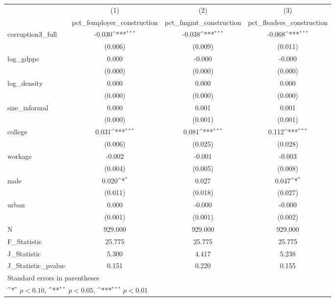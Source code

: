 {
\def\sym#1{\ifmmode^{#1}\else\(^{#1}\)\fi}
\begin{tabular}{l*{3}{c}}
\hline\hline
            &\multicolumn{1}{c}{(1)}&\multicolumn{1}{c}{(2)}&\multicolumn{1}{c}{(3)}\\
            &\multicolumn{1}{c}{pct\_femployer\_construction}&\multicolumn{1}{c}{pct\_fmgmt\_construction}&\multicolumn{1}{c}{pct\_fleaders\_construction}\\
\hline
corruption3\_full&      -0.030\sym{***}&      -0.038\sym{***}&      -0.068\sym{***}\\
            &     (0.006)         &     (0.009)         &     (0.011)         \\
[1em]
log\_gdppc   &       0.000         &      -0.000         &      -0.000         \\
            &     (0.000)         &     (0.000)         &     (0.000)         \\
[1em]
log\_density &       0.000         &       0.000         &       0.000         \\
            &     (0.000)         &     (0.000)         &     (0.000)         \\
[1em]
size\_informal&       0.000         &       0.001         &       0.001         \\
            &     (0.000)         &     (0.001)         &     (0.001)         \\
[1em]
college     &       0.031\sym{***}&       0.081\sym{***}&       0.112\sym{***}\\
            &     (0.006)         &     (0.025)         &     (0.028)         \\
[1em]
workage     &      -0.002         &      -0.001         &      -0.003         \\
            &     (0.004)         &     (0.005)         &     (0.008)         \\
[1em]
male        &       0.020\sym{*}  &       0.027         &       0.047\sym{*}  \\
            &     (0.011)         &     (0.018)         &     (0.027)         \\
[1em]
urban       &       0.000         &      -0.000         &      -0.000         \\
            &     (0.001)         &     (0.001)         &     (0.002)         \\
\hline
N           &     929.000         &     929.000         &     929.000         \\
F\_Statistic &      25.775         &      25.775         &      25.775         \\
J\_Statistic &       5.300         &       4.417         &       5.238         \\
J\_Statistic\_pvalue&       0.151         &       0.220         &       0.155         \\
\hline\hline
\multicolumn{4}{l}{\footnotesize Standard errors in parentheses}\\
\multicolumn{4}{l}{\footnotesize \sym{*} \(p<0.10\), \sym{**} \(p<0.05\), \sym{***} \(p<0.01\)}\\
\end{tabular}
}
